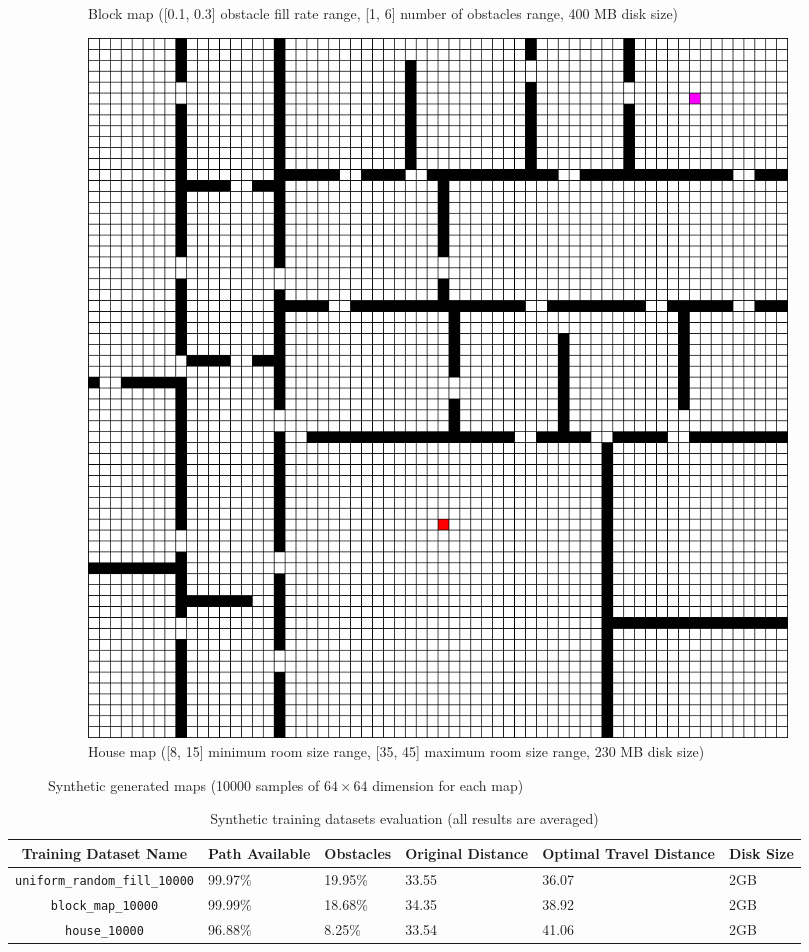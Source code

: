 \begin{figure}[h!]
\begin{subfigure}[b]{0.30\linewidth}
     \caption{Block map ([0.1, 0.3] obstacle fill rate range, [1, 6] number of obstacles range, 400 MB disk size)}
  \end{subfigure}
  \hfill
  \begin{subfigure}[b]{0.30\linewidth}
    \includegraphics[width=\linewidth]{images/screenshot_53.png}
     \caption{House map ([8, 15] minimum room size range, [35, 45] maximum room size range, 230 MB disk size)}
  \end{subfigure}
  \caption{Synthetic generated maps (10000 samples of $64\times64$ dimension for each map)}
  \label{fig: eval_generated maps}
\end{figure}

\pagebreak

\begin{table}[h!] 
\small
\centerfloat
    \begin{tabular}{|c|M{1.5cm}|M{1.5cm}|M{1.5cm}|M{1.5cm}|M{1cm}|}
    \hline
    \textbf{Training Dataset Name} & \textbf{Path Available} & \textbf{Obstacles} & \textbf{Original Distance} & \textbf{Optimal Travel Distance} & \textbf{Disk Size} \\
    \hline
    \texttt{uniform\_random\_fill\_10000} & 99.97\% & 19.95\% & 33.55 & 36.07 & 2GB \\
    \hline
    \texttt{block\_map\_10000} & 99.99\% & 18.68\% & 34.35 & 38.92 & 2GB \\
    \hline
    \texttt{house\_10000} & 96.88\% & 8.25\% & 33.54 & 41.06 & 2GB \\
    \hline
    \end{tabular}
\caption{Synthetic training datasets evaluation (all results are averaged)}
\label{tab: eval_maps}
\end{table}


